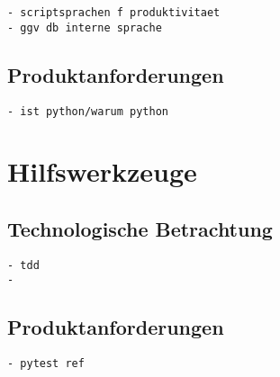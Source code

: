 \begin{verbatim}
- scriptsprachen f produktivitaet
- ggv db interne sprache
\end{verbatim}

\subsection{Produktanforderungen}

\begin{verbatim}
- ist python/warum python
\end{verbatim}


\section{Hilfswerkzeuge}
\subsection{Technologische Betrachtung}
\begin{verbatim}
- tdd
- 
\end{verbatim}
\subsection{Produktanforderungen}
\begin{verbatim}
- pytest ref
\end{verbatim}
